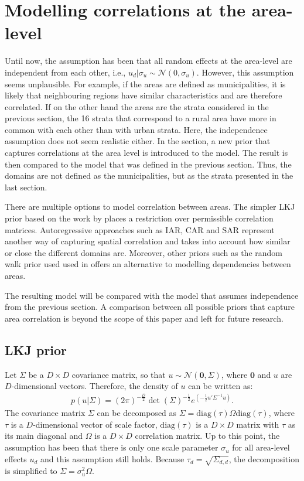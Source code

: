 \section{Modelling correlations at the area-level}

Until now, the assumption has been that all random effects at the area-level are independent from each other, i.e., $u_d|\sigma_u \sim \mathcal N (0, \sigma_u)$.
However, this assumption seems unplausible.
For example, if the areas are defined as municipalities, it is likely that neighbouring regions have similar characteristics and are therefore correlated.
If on the other hand the areas are the strata considered in the previous section, the 16 strata that correspond to a rural area have more in common with each other than with urban strata.
Here, the independence assumption does not seem realistic either.
In the section, a new prior that captures correlations at the area level is introduced to the model.
The result is then compared to the model that was defined in the previous section.
Thus, the domains are not defined as the municipalities, but as the strata presented in the last section.

There are multiple options to model correlation between areas.
The simpler LKJ prior based on the work by \cite{lewandowski_generating_2009} places a restriction over permissible correlation matrices.
Autoregressive approaches such as IAR, CAR and SAR \citep{chung_bayesian_2020} represent another way of capturing spatial correlation and takes into account how similar or close the different domains are.
Moreover, other priors such as the random walk prior used used in \cite{gao_improving_2021} offers an alternative to modelling dependencies between areas.

The resulting model will be compared with the model that assumes independence from the previous section.
A comparison between all possible priors that capture area correlation is beyond the scope of this paper and left for future research.

\subsection{LKJ prior}

Let $\Sigma$ be a $D \times D$ covariance matrix, so that $u \sim \mathcal{N}(\boldsymbol{0}, \Sigma)$, where $\boldsymbol 0$ and $u$ are $D$-dimensional vectors.
Therefore, the density of $u$ can be written as:
\begin{gather*}
    p(u|\Sigma) = (2\pi)^{-\frac D 2}\det(\Sigma)^{-\frac 1 2} e^{(-\frac 1 2 u'\Sigma^{-1} u)}.
\end{gather*}
The covariance matrix $\Sigma$ can be decomposed as $\Sigma = \text{diag}(\tau)\Omega\text{diag}(\tau)$, where $\tau$ is a $D$-dimensional vector of scale factor, $\text{diag}(\tau)$ is a $D \times D$ matrix with $\tau$ as its main diagonal and $\Omega$ is a $D \times D$ correlation matrix.
Up to this point, the assumption has been that there is only one scale parameter $\sigma_u$ for all area-level effects $u_d$ and this assumption still holds.
Because $\tau_d = \sqrt{\Sigma_{d, d}}$, the decomposition is simplified to $\Sigma = \sigma_u^2 \Omega$.

